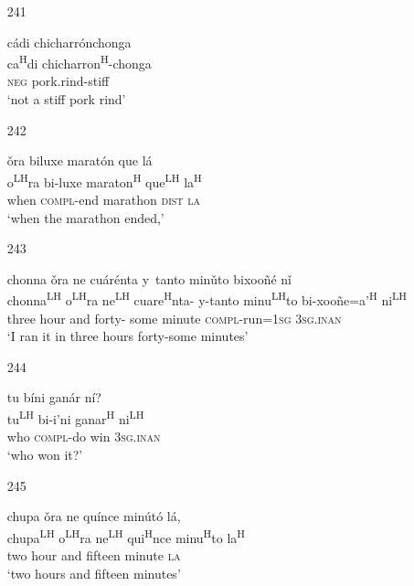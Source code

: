 \begin{itemize}
\item[241]
 
\glll   c\'{a}di chicharr\'{o}nchonga\\
 ca\textsuperscript{H}di chicharron\textsuperscript{H}-chonga\\
\textsc{neg} pork.rind-stiff\\
\glt `not a stiff pork rind'
 


\item[242]
 
\glll   \v{o}ra biluxe marat\'{o}n que l\'{a}\\
 o\textsuperscript{LH}ra bi-luxe maraton\textsuperscript{H} que\textsuperscript{LH} la\textsuperscript{H}\\
 when \textsc{compl}-end marathon \textsc{dist} \textsc{la}\\
\glt `when the marathon ended,'
 


\item[243]
 
\glll chonna \v{o}ra ne cu\'{a}r\'{e}nta y~tanto min\v{u}to bixoo\~{n}\'{e} n\v{i}\\
      chonna\textsuperscript{LH} o\textsuperscript{LH}ra ne\textsuperscript{LH} cuare\textsuperscript{H}nta- y-tanto minu\textsuperscript{LH}to bi-xoo\~{n}e=a'\textsuperscript{H} ni\textsuperscript{LH}\\ 
three hour and forty- some minute \textsc{compl}-run=\textsc{1sg} \textsc{3sg.inan}\\
\glt `I ran it in three hours forty-some minutes'
 


\item[244]
 
tu b\'{i}ni gan\'{a}r n\'{i}?\\
tu\textsuperscript{LH} bi-i'ni ganar\textsuperscript{H} ni\textsuperscript{LH}\\
who \textsc{compl}-do win \textsc{3sg.inan}\\
\glt `who won it?'
 

\item[245]
 
\glll   chupa \v{o}ra ne qu\'{i}nce min\'{u}t\'{o} l\'{a},\\
 chupa\textsuperscript{LH} o\textsuperscript{LH}ra ne\textsuperscript{LH} qui\textsuperscript{H}nce minu\textsuperscript{H}to la\textsuperscript{H}\\
 two hour and fifteen minute \textsc{la}\\
\glt `two hours and fifteen minutes'
 



\end{itemize}

